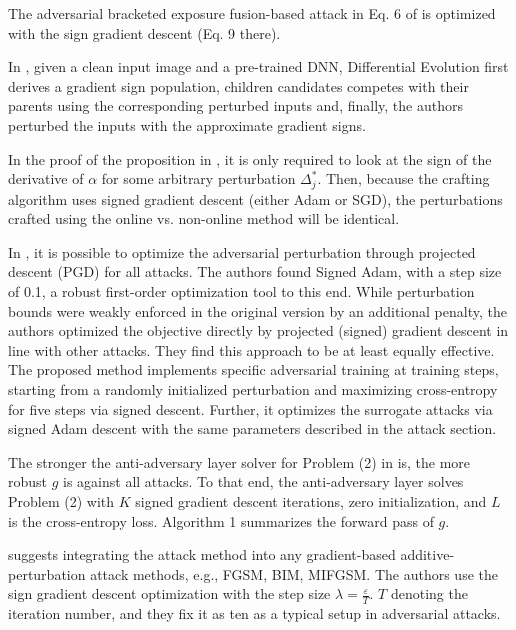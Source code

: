 \documentclass[11pt]{book}
\begin{document}
The adversarial bracketed exposure fusion-based attack in Eq. 6 of
\cite{cheng2020adversarial} is optimized with the sign gradient descent
(Eq. 9 there).

In \cite{lin2020black}, given a clean input image and a pre-trained
DNN, Differential Evolution first derives a gradient sign population,
children candidates competes with their parents using the corresponding
perturbed inputs and, finally, the authors perturbed the inputs with
the approximate gradient signs.

In the proof of the proposition in \cite{fowl2021preventing}, it
is only required to look at the sign of the derivative of \textquotedbl$\alpha$\textquotedbl{}
for some arbitrary perturbation $\Delta_{j}^{\ast}$. Then, because
the crafting algorithm uses signed gradient descent (either Adam or
SGD), the perturbations crafted using the online vs. non-online method
will be identical.

In \cite{geiping2021doesn}, it is possible to optimize the adversarial
perturbation through projected descent (PGD) for all attacks. The
authors found Signed Adam, with a step size of 0.1, a robust first-order
optimization tool to this end. While perturbation bounds were weakly
enforced in the original version by an additional penalty, the authors
optimized the objective directly by projected (signed) gradient descent
in line with other attacks. They find this approach to be at least
equally effective. The proposed method implements specific adversarial
training at training steps, starting from a randomly initialized perturbation
and maximizing cross-entropy for five steps via signed descent. Further,
it optimizes the surrogate attacks via signed Adam descent with the
same parameters described in the attack section.

The stronger the anti-adversary layer solver for Problem (2) in \cite{alfarra2021combating}
is, the more robust $g$ is against all attacks. To that end, the
anti-adversary layer solves Problem (2) with $K$ signed gradient
descent iterations, zero initialization, and $L$ is the cross-entropy
loss. Algorithm 1 summarizes the forward pass of $g$.

\cite{gao2021adversarial} suggests integrating the attack method
into any gradient-based additive-perturbation attack methods, e.g.,
FGSM, BIM, MIFGSM. The authors use the sign gradient descent optimization
with the step size $\lambda=\frac{\varepsilon}{T}$. $T$ denoting
the iteration number, and they fix it as ten as a typical setup in
adversarial attacks.
\end{document}
